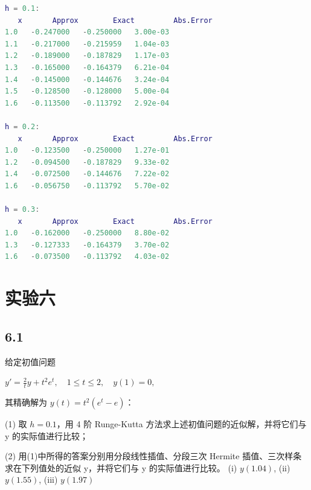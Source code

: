 \begin{lstlisting}[language=matlab]
h = 0.1:
   x       Approx        Exact         Abs.Error
1.0   -0.247000   -0.250000   3.00e-03
1.1   -0.217000   -0.215959   1.04e-03
1.2   -0.189000   -0.187829   1.17e-03
1.3   -0.165000   -0.164379   6.21e-04
1.4   -0.145000   -0.144676   3.24e-04
1.5   -0.128500   -0.128000   5.00e-04
1.6   -0.113500   -0.113792   2.92e-04

h = 0.2:
   x       Approx        Exact         Abs.Error
1.0   -0.123500   -0.250000   1.27e-01
1.2   -0.094500   -0.187829   9.33e-02
1.4   -0.072500   -0.144676   7.22e-02
1.6   -0.056750   -0.113792   5.70e-02

h = 0.3:
   x       Approx        Exact         Abs.Error
1.0   -0.162000   -0.250000   8.80e-02
1.3   -0.127333   -0.164379   3.70e-02
1.6   -0.073500   -0.113792   4.03e-02
\end{lstlisting}


\section{实验六}
\subsection*{6.1}
给定初值问题

$y' = \frac{2}{t}y + t^2 e^t, \quad 1 \leq t \leq 2, \quad y(1) = 0,$

其精确解为 $y(t) = t^2(e^t - e)$：

(1) 取 $h = 0.1$，用 4 阶 Runge-Kutta 方法求上述初值问题的近似解，并将它们与 y 的实际值进行比较；

(2) 用(1)中所得的答案分别用分段线性插值、分段三次 Hermite 插值、三次样条求在下列值处的近似 y，并将它们与 y 的实际值进行比较。
(i) $y(1.04)$, (ii) $y(1.55)$, (iii) $y(1.97)$

